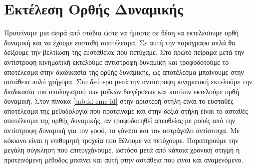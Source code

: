 \section{Εκτέλεση Ορθής Δυναμικής}

Προτείναμε μια σειρά από στάδια ώστε να ήμαστε σε θέση να εκτελέσουμε ορθή δυναμική και να έχουμε ευσταθή αποτέλεσμα. Σε αυτή την παράγραφο απλά θα δείξουμε την βελτίωση της ευστάθειας που πετύχαμε. Στο πρώτο πείραμα μετά την αντίστροφη κινηματική εκτελούμε αντίστροφη δυναμική και τροφοδοτούμε το αποτέλεσμα στην διαδικασία της ορθής δυναμικής, ως αποτέλεσμα μπαίνουμε στην αστάθεια πολύ γρήγορα. Στο δεύτερο μετά την αντίστροφη κινηματική εκτελούμε την διαδικασία του υπολογισμού των μυϊκών διεγέρσεων και κατόπιν εκτελούμε ορθή δυναμική. Στον πίνακα \ref{tab:fd-cmc-id} στην αριστερή στήλη είναι το ευσταθές αποτέλεσμα της μεθοδολογία που προτείναμε και στην δεξιά στήλη είναι το ασταθές αποτέλεσμα της ορθής δυναμικής, αν τροφοδοτηθεί απευθείας με ροπές από την αντίστροφη δυναμική για τον γοφό, το γόνατο και τον αστράγαλο αντίστοιχα. Με κόκκινο είναι η επιθυμητή τροχεία που θέλουμε να πετύχουμε. Παρατηρούμε την μεγάλη σύγκληση που επιτυγχάνουμε, ωστόσο μετά από κάποια χρονική στιγμή η προτεινόμενη μέθοδος μπαίνει και αυτή στην αστάθεια που είναι και αναμενόμενο.

